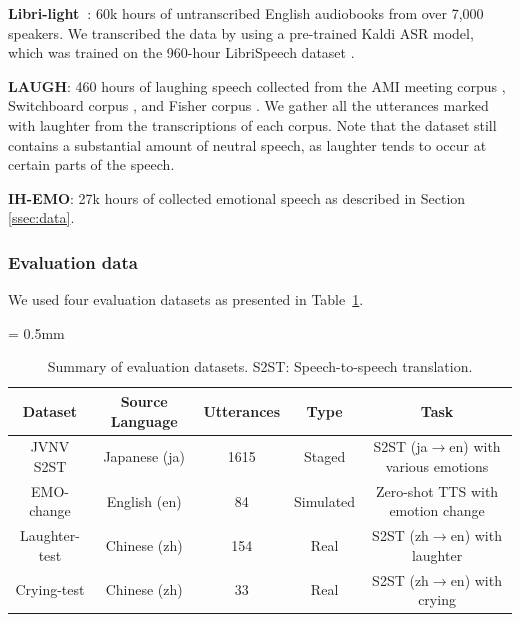\textbf{Libri-light~\cite{kahn2020libri}}: 60k hours of untranscribed English audiobooks from over 7,000 speakers. 
We transcribed the data by using a pre-trained Kaldi ASR model, 
which was trained on the 960-hour LibriSpeech dataset \cite{panayotov2015librispeech}.

\textbf{LAUGH}: 460 hours of laughing speech collected from the AMI meeting corpus \cite{carletta2005ami}, Switchboard corpus \cite{godfrey1992switchboard}, and Fisher corpus \cite{cieri2004fisher}. We gather all the utterances marked with laughter from the transcriptions of each corpus.  Note that the dataset still contains a substantial amount of neutral speech, as laughter tends to occur at certain parts of the speech.

\textbf{IH-EMO}: 27k hours of collected emotional speech as described in Section \ref{ssec:data}.

\vspace{-.5em}
\subsubsection{Evaluation data}
\vspace{-.5em}

We used four evaluation datasets as presented in Table~\ref{table:eval_datasets}.

\begin{table}[t]
\centering
\caption{Summary of evaluation datasets. S2ST: Speech-to-speech translation.}
\label{table:eval_datasets}
\resizebox{0.48\textwidth}{!}
{
\centering
 \tabcolsep = 0.5mm
    \begin{tabular}{@{}ccccc@{}}
    \toprule
    \textbf{Dataset} & \textbf{Source Language} & \textbf{Utterances} & \textbf{Type} & \textbf{Task} \\ 
    \midrule
    JVNV S2ST & Japanese (ja) & 1615 & Staged & S2ST (ja$\rightarrow$en) with various emotions \\ 
    EMO-change & English (en) & 84 & Simulated & Zero-shot TTS with emotion change \\ 
    Laughter-test & Chinese (zh) & 154 & Real & S2ST (zh$\rightarrow$en) with laughter\\ 
    Crying-test & Chinese (zh) & 33 & Real & S2ST (zh$\rightarrow$en) with crying \\ \bottomrule
    \end{tabular}
}
\vspace{-3mm}
\end{table}

